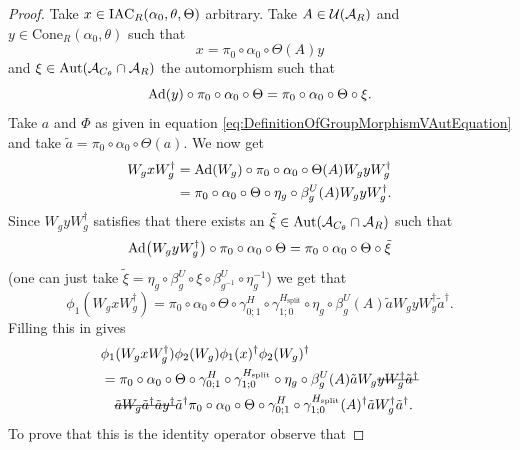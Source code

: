 \documentclass[12pt,a4paper,twoside]{article}
\numberwithin{equation}{section}
\begin{document}
\begin{proof}
	Take $x\in \textrm{IAC}_R(\alpha_0,\theta,\Theta)$ arbitrary. Take $A\in\mathcal U(\mathcal A_R)$ and $y\in\text{Cone}_R(\alpha_0,\theta)$ such that
	\begin{equation}
		x=\pi_0\circ\alpha_0\circ\Theta(A)y
	\end{equation}
	and $\xi\in\Aut{\AA_{C_\theta}\cap \AA_R}$ the automorphism such that
	\begin{equation}
		\Ad{y}\circ\pi_0\circ\alpha_0\circ\Theta=\pi_0\circ\alpha_0\circ\Theta\circ\xi.
	\end{equation}
	Take $a$ and $\Phi$ as given in equation \eqref{eq:DefinitionOfGroupMorphismVAutEquation} and take $\tilde{a}=\pi_0\circ\alpha_0\circ\Theta(a)$. We now get
	\begin{align}
		W_g x W_g^\dagger&=\Ad{W_g}\circ\pi_0\circ\alpha_0\circ\Theta(A) W_gyW_g^\dagger\\
		&=\pi_0\circ\alpha_0\circ\Theta\circ\eta_g\circ\beta_g^U(A) W_gyW_g^\dagger.
	\end{align}
	Since $W_g yW_g^\dagger$ satisfies that there exists an $\tilde{\xi}\in\Aut{\AA_{C_\theta}\cap \AA_R}$ such that
	\begin{equation}
		\Ad{W_gyW_g^\dagger}\circ \pi_0\circ\alpha_0\circ\Theta=\pi_0\circ\alpha_0\circ\Theta\circ\tilde\xi
	\end{equation}
	(one can just take $\tilde\xi=\eta_g\circ\beta_g^U\circ\xi\circ\beta_{g^{-1}}^U\circ\eta_g^{-1}$) we get that
	\begin{equation}\label{eq:lem:phi1phi2matchingCondition:Proof_W_g_Part}
		\phi_1(W_gxW_g^{\dagger})=\pi_0\circ\alpha_0\circ\Theta\circ\gamma^{H}_{0;1}\circ\gamma^{H_\text{split}}_{1;0}\circ\eta_g\circ\beta_g^U(A)\tilde{a}W_gyW_g^\dagger\tilde{a}^\dagger.
	\end{equation}
	Filling this in gives
	\begin{align}
		&\phi_1(W_gxW_g^\dagger)\phi_2(W_g)\phi_1(x)^\dagger\phi_2(W_g)^\dagger\\
		\label{eq:phi1phi2matchingConditionEquation}
		&=\pi_0\circ\alpha_0\circ\Theta\circ\gamma^{H}_{0;1}\circ\gamma^{H_\text{split}}_{1;0}\circ\eta_g\circ\beta_g^U(A)\tilde{a}W_g\stkout{yW_g^\dagger\tilde{a}^\dagger}\\
		\nonumber
		&\quad\stkout{\tilde{a}W_g\tilde{a}^\dagger\tilde{a}y^\dagger}\tilde{a}^\dagger\pi_0\circ\alpha_0\circ\Theta\circ\gamma^{H}_{0;1}\circ\gamma^{H_\text{split}}_{1;0}(A)^\dagger\tilde{a}W_g^\dagger\tilde{a}^\dagger.
	\end{align}
	To prove that this is the identity operator observe that

\end{proof}
\end{document}
